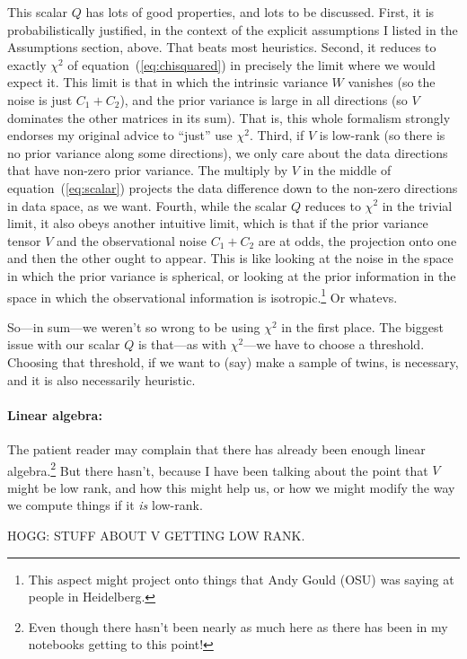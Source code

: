 \documentclass[12pt,letterpaper]{article}
\newcommand{\equationname}{equation}
\begin{document}
This scalar $Q$ has lots of good properties, and lots to be discussed.
First, it is probabilistically justified, in the context of the explicit
assumptions I listed in the Assumptions section, above. That beats most
heuristics.
Second, it reduces to exactly $\chi^2$ of \equationname~(\ref{eq:chisquared}) in
precisely the limit where we would expect it. This limit is that in which the
intrinsic variance $W$ vanishes (so the noise is just $C_1 + C_2$), and the prior
variance is large in all directions (so $V$ dominates the other matrices in its
sum). That is, this whole formalism strongly endorses my original advice to ``just''
use $\chi^2$.
Third, if $V$ is low-rank (so there is no prior variance along some directions),
we only care about the data directions that have non-zero prior variance. The
multiply by $V$ in the middle of \equationname~(\ref{eq:scalar}) projects the
data difference down to the non-zero directions in data space, as we want.
Fourth, while the scalar $Q$ reduces to $\chi^2$ in the trivial limit,
it also obeys another intuitive limit, which is that if the prior
variance tensor $V$ and the observational noise $C_1 + C_2$ are at
odds, the projection onto one and then the other ought to appear. This
is like looking at the noise in the space in which the prior variance
is spherical, or looking at the prior information in the space in
which the observational information is isotropic.\footnote{This aspect
  might project onto things that Andy Gould (OSU) was saying at people
  in Heidelberg.} Or whatevs.

So---in sum---we weren't so wrong to be using $\chi^2$ in the first
place.
The biggest issue with our scalar $Q$ is that---as with $\chi^2$---we have to choose a
threshold. Choosing that threshold, if we want to (say) make a sample
of twins, is necessary, and it is also necessarily heuristic.

\paragraph{Linear algebra:}
The patient reader may complain that there has already been enough
linear algebra.\footnote{Even though there hasn't been nearly as much
  here as there has been in my notebooks getting to this point!}
But there hasn't, because I have been talking about the point that
$V$ might be low rank, and how this might help us, or how we might modify
the way we compute things if it \emph{is} low-rank.

HOGG: STUFF ABOUT V GETTING LOW RANK.
\end{document}

